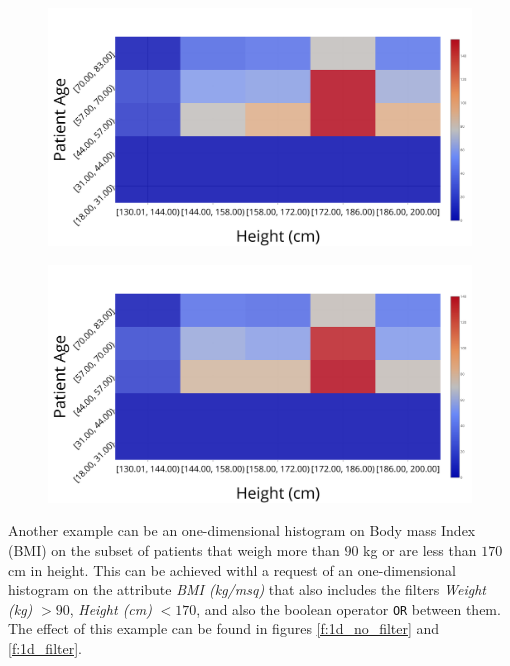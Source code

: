 \begin{figure}[th]
\centering
\begin{minipage}{.5\textwidth}
  \centering
  \includegraphics[width=\columnwidth]{figures/2d_1_filter.png}
  \label{f:2d_1_filter}
\end{minipage}%
\begin{minipage}{.5\textwidth}
  \centering
  \includegraphics[width=\columnwidth]{figures/2d_filter.png}
  \label{f:2d_filter}
\end{minipage}
\end{figure}


Another example can be an one\hyp dimensional histogram on Body mass Index (BMI) on the subset of patients that weigh more than $90$ kg or are less than $170$ cm in height.
This can be achieved withl a request of an one\hyp dimensional histogram on the attribute \textit{BMI (kg/msq)} that also includes the filters \textit{Weight (kg)} $ > 90$, \textit{Height (cm)} $ < 170$, and also the boolean operator \texttt{OR} between them.
The effect of this example can be found in figures \ref{f:1d_no_filter} and \ref{f:1d_filter}.

